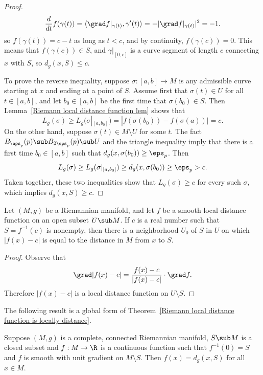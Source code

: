 \begin{proof}
\[\frac{d}{dt}f(\gamma(t))=\langle\grad f|_{\gamma(t)},\gamma'(t)\rangle=-|\grad f|_{\gamma(t)}|^2=-1.\]
so $f(\gamma(t))=c-t$ as long as $t<c$, and by continuity, $f(\gamma(c))=0$. This means that $f(\gamma(c))\in S$, and $\gamma|_{[0,c]}$ is a curve segment of length $c$ 
connecting $x$ with $S$, so $d_g(x,S)\leq c$.\par
To prove the reverse inequality, suppose $\sigma:[a,b]\to M$ is any admissible curve starting at $x$ and ending at a point of $S$. Assume first that $\sigma(t)\in U$ for 
all $t\in[a,b]$, and let $b_0\in[a,b]$ be the first time that $\sigma(b_0)\in S$. Then Lemma~\ref{Riemann local distance function lem} shows that
\[L_g(\sigma)\geq L_g(\sigma|_{[a,b_0]})=|f(\sigma(b_0))-f(\sigma(a))|=c.\]
On the other hand, suppose $\sigma(t)\in M\setminus U$ for some $t$. The fact $B_{\eps_p}(p)\sub B_{2\eps_p}(p)\sub U$ and the triangle inequality imply that there is 
a first time $b_0\in[a,b]$ such that $d_g(x,\sigma(b_0))\geq\eps_p$. Then 
\[L_g(\sigma)\geq L_g(\sigma|_{[a,b_0]})\geq d_g(x,\sigma(b_0))\geq\eps_p>c.\]
Taken together, these two inequalities show that $L_g(\sigma)\geq c$ for every such $\sigma$, which implies $d_g(x,S)\geq c$.
\end{proof}
\begin{corollary}\label{Riemann local distance level set}
Let $(M,g)$ be a Riemannian manifold, and let $f$ be a smooth local distance function on an open subset $U\sub M$. If $c$ is a real number such that $S=f^{-1}(c)$ is 
nonempty, then there is a neighborhood $U_0$ of $S$ in $U$ on which $|f(x)-c|$ is equal to the distance in $M$ from $x$ to $S$.
\end{corollary}
\begin{proof}
Observe that 
\[\grad |f(x)-c|=\frac{f(x)-c}{|f(x)-c|}\cdot\grad f.\]
Therefore $|f(x)-c|$ is a local distance function on $U\setminus S$.
\end{proof}
The following result is a global form of Theorem~\ref{Riemann local distance function is locally distance}.
\begin{theorem}
Suppose $(M,g)$ is a complete, connected Riemannian manifold, $S\sub M$ is a closed subset and $f:M\to\R$ is a continuous function such that $f^{-1}(0)=S$ and $f$ is smooth 
with unit gradient on $M\setminus S$. Then $f(x)=d_g(x,S)$ for all $x\in M$.
\end{theorem}
